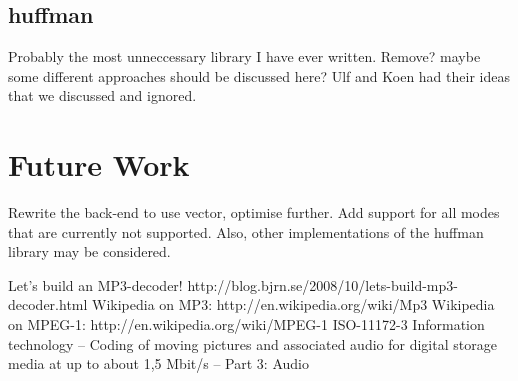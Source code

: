 \documentclass[a4paper,12pt]{article}
\begin{document}
    \subsection{huffman}
    \label{sec:huffman}
        Probably the most unneccessary library I have ever written. Remove?
        maybe some different approaches should be discussed here? Ulf and Koen
        had their ideas that we discussed and ignored.

\section{Future Work}
    Rewrite the back-end to use vector, optimise further. Add support for
    all modes that are currently not supported. Also, other implementations of
    the huffman library may be considered. 

\begin{thebibliography}{99}
        Let's build an MP3-decoder!
        http://blog.bjrn.se/2008/10/lets-build-mp3-decoder.html
        Wikipedia on MP3: http://en.wikipedia.org/wiki/Mp3
        Wikipedia on MPEG-1: http://en.wikipedia.org/wiki/MPEG-1
        ISO-11172-3 Information technology -- Coding of moving pictures and
        associated audio for digital storage media at up to about 1,5 Mbit/s --
        Part 3: Audio
\end{thebibliography}
\end{document}
